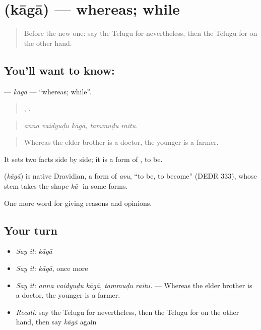 \section[\texorpdfstring{\te{కాగా} (kāgā)}{కాగా (kāgā)}]{ (kāgā) — whereas; while}

\label{lesson:TE-C396-kaga}



\begin{quote}
Before the new one: say the Telugu for nevertheless, then the Telugu for on the other hand.
\end{quote}

\subsection*{You'll want to know: }
\textbf{} — \emph{kāgā} — \textquotedblleft{}whereas; while\textquotedblright{}.

\begin{quote}
  ,  .
\end{quote}

\begin{quote}
\emph{anna vaidyuḍu kāgā, tammuḍu raitu.}
\end{quote}

\begin{quote}
Whereas the elder brother is a doctor, the younger is a farmer.
\end{quote}

It sets two facts side by side; it is a form of , to be.

\begin{cousinweb}
\textbf{} (\emph{kāgā}) is native Dravidian, a form of \emph{avu}, \textquotedblleft{}to be, to become\textquotedblright{} (DEDR 333), whose stem takes the shape \emph{kā-} in some forms.
\end{cousinweb}

\begin{grammarlens}[title={What you've built}]
One more word for giving reasons and opinions.
\end{grammarlens}

\subsection*{Your turn}
\begin{itemize}
\raggedright
  \item \emph{Say it:} \emph{kāgā}
  \item \emph{Say it:} \emph{kāgā}, once more
  \item \emph{Say it:} \emph{anna vaidyuḍu kāgā, tammuḍu raitu.} — Whereas the elder brother is a doctor, the younger is a farmer.
  \item \emph{Recall:} say the Telugu for nevertheless, then the Telugu for on the other hand, then say \emph{kāgā} again
\end{itemize}

